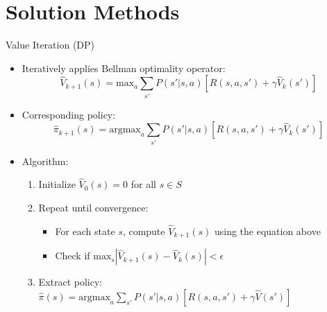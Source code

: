 \documentclass[10pt]{beamer}
\renewcommand{\max}{\text{max}}
\newcommand{\argmax}{\text{argmax}}
\begin{document}

\section{Solution Methods}


\begin{frame}{Value Iteration (DP)}
    \begin{itemize}
        \item Iteratively applies Bellman optimality operator:
        \begin{equation}
            \hat{V}_{k+1}(s) = \max_a \sum_{s'} P(s'|s,a) \left[ R(s,a,s') + \gamma \hat{V}_k(s') \right]
        \end{equation}
        
        \item Corresponding policy:
        \begin{equation}
            \hat{\pi}_{k+1}(s) = \argmax_a \sum_{s'} P(s'|s,a) \left[ R(s,a,s') + \gamma \hat{V}_k(s') \right]
        \end{equation}
        
        \item Algorithm:
        \begin{enumerate}
            \item Initialize $\hat{V}_0(s) = 0$ for all $s \in S$
            \item Repeat until convergence:
            \begin{itemize}
                \item For each state $s$, compute $\hat{V}_{k+1}(s)$ using the equation above
                \item Check if $\max_s |\hat{V}_{k+1}(s) - \hat{V}_k(s)| < \epsilon$
            \end{itemize}
            \item Extract policy: $\hat{\pi}(s) = \argmax_a \sum_{s'} P(s'|s,a) [R(s,a,s') + \gamma \hat{V}(s')]$
        \end{enumerate}
    \end{itemize}
\end{frame}
\end{document}

